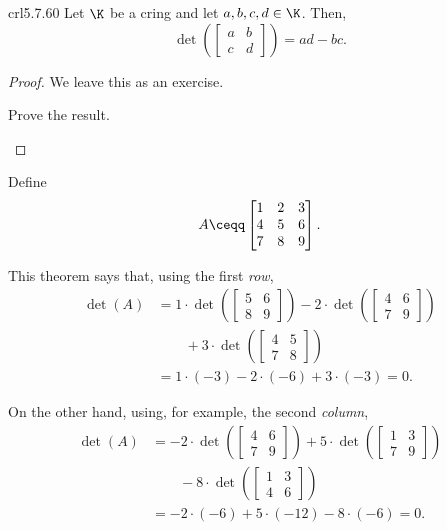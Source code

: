 \begin{crl}{}{crl5.7.60}
	Let $\K$ be a cring and let $a,b,c,d\in \K$.  Then,
	\begin{equation}
		\det \left( \begin{bmatrix}a & b \\ c & d\end{bmatrix}\right) =ad-bc.
	\end{equation}
	\begin{proof}
		We leave this as an exercise.
		\begin{exr}[breakable=false]{}{}
			Prove the result.
		\end{exr}
	\end{proof}
\end{crl}
\begin{exm}{}{}
	Define
	\begin{equation}
		A\ceqq \begin{bmatrix}1 & 2 & 3 \\ 4 & 5 & 6 \\ 7 & 8 & 9\end{bmatrix}.
	\end{equation}
	
	This theorem says that, using the first \emph{row},
	\begin{equation}
		\begin{split}
			\det (A) & =1\cdot \det \left( \begin{bmatrix}5 & 6 \\ 8 & 9\end{bmatrix}\right) -2\cdot \det \left( \begin{bmatrix}4 & 6 \\ 7 & 9\end{bmatrix}\right) \\ & \qquad +3\cdot \det \left( \begin{bmatrix}4 & 5 \\ 7 & 8\end{bmatrix}\right) \\
			& =1\cdot (-3)-2\cdot (-6)+3\cdot (-3)=0.
		\end{split}
	\end{equation}
	
	On the other hand, using, for example, the second \emph{column},
	\begin{equation}
		\begin{split}
			\det (A) & =-2 \cdot \det \left( \begin{bmatrix}4 & 6 \\ 7 & 9\end{bmatrix}\right) +5\cdot \det \left( \begin{bmatrix}1 & 3 \\ 7 & 9\end{bmatrix}\right) \\ & \qquad -8\cdot \det \left( \begin{bmatrix}1 & 3 \\ 4 & 6\end{bmatrix}\right) \\
			& =-2\cdot (-6)+5\cdot (-12)-8\cdot (-6)=0.
		\end{split}
	\end{equation}
\end{exm}
